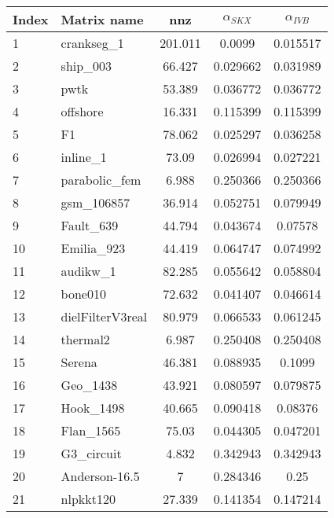 \begin{tabular}{|l|l|S[round-mode=places,round-precision=2]|S[round-mode=places,round-precision=4]|S[round-mode=places,round-precision=4]|}
\toprule
{Index} & {Matrix name} &  {nnz} & {$\alpha_{SKX}$} & {$\alpha_{IVB}$}  \\
\midrule
{1}& {	crankseg\_1                }	& 201.011	& 0.0099	& 0.015517	\\
{2}& {	ship\_003                  }	& 66.427	& 0.029662	& 0.031989	\\
{3}& {	pwtk                      }	& 53.389	& 0.036772	& 0.036772	\\
{4}& {	offshore                  }	& 16.331	& 0.115399	& 0.115399	\\
{5}& {	F1                        }	& 78.062	& 0.025297	& 0.036258	\\
{6}& {	inline\_1                  }	& 73.09	& 0.026994	& 0.027221	\\
{7}& {	parabolic\_fem             }	& 6.988	& 0.250366	& 0.250366	\\
{8}& {	gsm\_106857                }	& 36.914	& 0.052751	& 0.079949	\\
{9}& {	Fault\_639                 }	& 44.794	& 0.043674	& 0.07578	\\
{10}& {	Emilia\_923                }	& 44.419	& 0.064747	& 0.074992	\\
{11}& {	audikw\_1                  }	& 82.285	& 0.055642	& 0.058804	\\
{12}& {	bone010                   }	& 72.632	& 0.041407	& 0.046614	\\
{13}& {	dielFilterV3real          }	& 80.979	& 0.066533	& 0.061245	\\
{14}& {	thermal2                  }	& 6.987	& 0.250408	& 0.250408	\\
{15}& {	Serena                    }	& 46.381	& 0.088935	& 0.1099	\\
{16}& {	Geo\_1438                  }	& 43.921	& 0.080597	& 0.079875	\\
{17}& {	Hook\_1498                 }	& 40.665	& 0.090418	& 0.08376	\\
{18}& {	Flan\_1565                 }	& 75.03	& 0.044305	& 0.047201	\\
{19}& {	G3\_circuit                }	& 4.832	& 0.342943	& 0.342943	\\
{20}& {	Anderson-16.5             }	& 7	& 0.284346	& 0.25	\\
{21}& {	nlpkkt120                 }	& 27.339	& 0.141354	& 0.147214	\\

\end{tabular}
